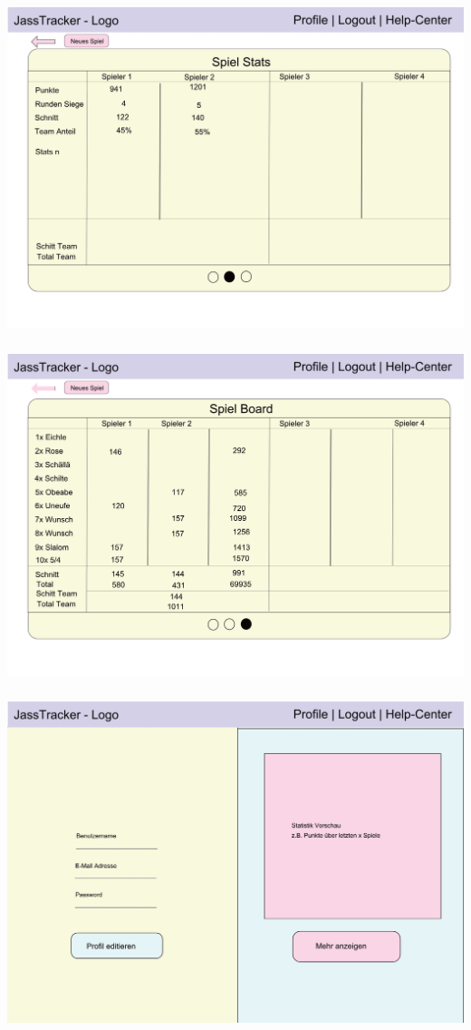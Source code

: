 \includegraphics[height=10cm, width=\textwidth]{resources/mockups/mockup-eof-stats}
\includegraphics[height=10cm, width=\textwidth]{resources/mockups/mockup-eof-scoreboard}
\includegraphics[height=10cm, width=\textwidth]{resources/mockups/mockup-profile-overview}
